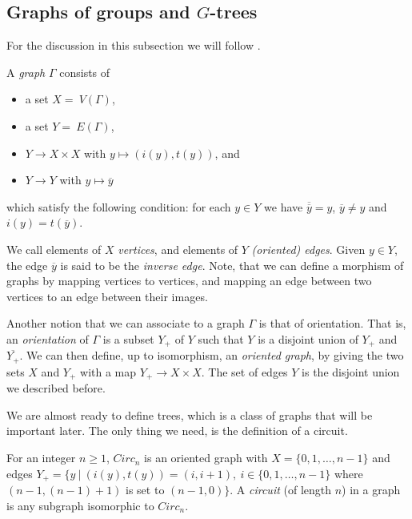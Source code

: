 \subsection{Graphs of groups and $G$-trees}
\label{subsec:graphs_of_groups}

For the discussion in this subsection we will follow \cite[chapter I]{serre_trees_1980}.
\begin{definition}
\label{def:graph}
    A \emph{graph} $\Gamma$ consists of 
    \begin{itemize}
        \item a set $X = \:V(\Gamma)$,
        \item a set $Y = \:E(\Gamma)$,
        \item $Y \to  X \times X$ with $ y \mapsto (i(y), t(y))$, and 
        \item $Y \to Y$ with $y \mapsto \overline{y}$
    \end{itemize}
     which satisfy the following condition: for each $y \in Y$ we have $\overline{\overline{y}} = y$, $\overline{y} \neq y$ and $i(y) = t(\overline{y})$.
\end{definition}

We call elements of $X$ \emph{vertices}, and elements of $Y$ \emph{(oriented) edges}. Given $y \in Y$, the edge $\overline{y}$ is said to be the \emph{inverse edge}. Note, that we can define a morphism of graphs by mapping vertices to vertices, and mapping an edge between two vertices to an edge between their images.

Another notion that we can associate to a graph $\Gamma$ is that of orientation. That is, an \emph{orientation} of $\Gamma$ is a subset $Y_+$ of $Y$ such that $Y$ is a disjoint union of $Y_+$ and $\overline{Y_+}$. We can then define, up to isomorphism, an \emph{oriented graph}, by giving the two sets $X$ and $Y_+$ with a map $Y_+ \to X \times X$. The set of edges $Y$ is the disjoint union we described before.

We are almost ready to define trees, which is a class of graphs that will be important later. The only thing we need, is the definition of a circuit.

\begin{definition}
    For an integer $n \ge 1$, $Circ_n$ is an oriented graph with $X = \{0,1, \ldots , n-1 \}$ and edges $Y_+ = \{ y \:| \: (i(y),t(y)) = (i,i+1), \: i\in \{0,1,\ldots,n-1\} $ where $(n-1, (n-1) + 1)$ is set to $(n-1,0)\}$. A \emph{circuit} (of length $n$) in a graph is any subgraph isomorphic to $Circ_n$.
\end{definition}

